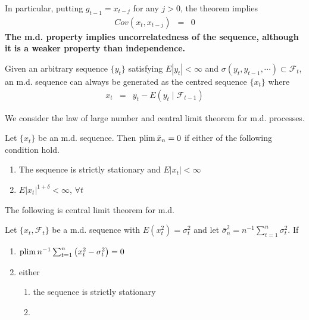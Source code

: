 In particular, putting $g_{t-1}=x_{t-j}$ for any $j>0$, the theorem implies 
\begin{eqnarray*}
Cov(x_{t},x_{t-j})&=&0
\end{eqnarray*}
\textbf{The m.d. property implies uncorrelatedness of the sequence, although it is a weaker property than independence.} 

Given an arbitrary sequence $\{y_{t}\}$ satisfying $E|y_{t}|<\infty$ and $\sigma\left(y_{t},y_{t-1},\cdots\right)\subset \mathcal{F}_{t}$, an m.d. sequence can always be generated as the centred sequence $\{x_{t}\}$ where 
\begin{eqnarray*}
x_{t}&=&y_{t}-E(y_{t}\mid\mathcal{F}_{t-1})
\end{eqnarray*}

We consider the law of large number and central limit theorem for m.d. processes.
\begin{theorem}
Let $\{x_{t}\}$ be an m.d. sequence. Then $\operatorname*{plim} \bar{x}_{n}=0$ if either of the following condition hold.
\begin{enumerate}
\item The sequence is strictly stationary and $E|x_{t}|<\infty$
\item $E|x_{t}|^{1+\delta}<\infty$, $\forall t$
\end{enumerate}
\end{theorem}

The following is central limit theorem for m.d.
\begin{theorem}
Let $\{x_{t},\mathcal{F}_{t}\}$ be a m.d. sequence with $E(x_{t}^{2})=\sigma_{t}^{2}$ and let $\bar{\sigma}_{n}^{2}=n^{-1}\sum_{t=1}^{n}\sigma_{t}^{2}$. If
\begin{enumerate}
\item  $\operatorname*{plim} n^{-1}\sum_{t=1}^{n}\left(x_{t}^{2}-\sigma_{t}^{2}\right)=0$
\item either 
	\begin{enumerate}
	\item the sequence is strictly stationary
	\item 
	\end{enumerate}
\end{enumerate}
\end{theorem}